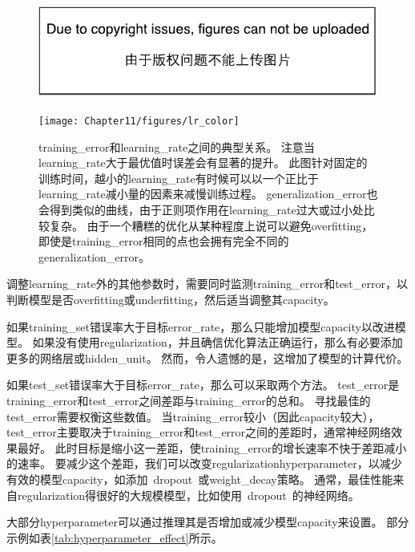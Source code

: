 \begin{figure}[!htb]
\ifOpenSource
\centerline{\includegraphics{figure.pdf}}
\else
\centerline{\texttt{[image: Chapter11/figures/lr\_color]}}
\fi
\caption{\gls{training_error}和\gls{learning_rate}之间的典型关系。
注意当\gls{learning_rate}大于最优值时误差会有显著的提升。
此图针对固定的训练时间，越小的\gls{learning_rate}有时候可以以一个正比于\gls{learning_rate}减小量的因素来减慢训练过程。
\gls{generalization_error}也会得到类似的曲线，由于正则项作用在\gls{learning_rate}过大或过小处比较复杂。
由于一个糟糕的优化从某种程度上说可以避免\gls{overfitting}，即使是\gls{training_error}相同的点也会拥有完全不同的\gls{generalization_error}。}
\label{fig:chap11_lr}
\end{figure}

调整\gls{learning_rate}外的其他参数时，需要同时监测\gls{training_error}和\gls{test_error}，以判断模型是否\gls{overfitting}或\gls{underfitting}，然后适当调整其\gls{capacity}。


如果\gls{training_set}错误率大于目标\gls{error_rate}，那么只能增加模型\gls{capacity}以改进模型。
如果没有使用\gls{regularization}，并且确信优化算法正确运行，那么有必要添加更多的网络层或\gls{hidden_unit}。
然而，令人遗憾的是，这增加了模型的计算代价。


如果\gls{test_set}错误率大于目标\gls{error_rate}，那么可以采取两个方法。
\gls{test_error}是\gls{training_error}和\gls{test_error}之间差距与\gls{training_error}的总和。
寻找最佳的\gls{test_error}需要权衡这些数值。
当\gls{training_error}较小（因此\gls{capacity}较大），\gls{test_error}主要取决于\gls{training_error}和\gls{test_error}之间的差距时，通常神经网络效果最好。
此时目标是缩小这一差距，使\gls{training_error}的增长速率不快于差距减小的速率。
要减少这个差距，我们可以改变\gls{regularization}\gls{hyperparameter}，以减少有效的模型\gls{capacity}，如添加~\gls{dropout}~或\gls{weight_decay}策略。
通常，最佳性能来自\gls{regularization}得很好的大规模模型，比如使用~\gls{dropout}~的神经网络。


大部分\gls{hyperparameter}可以通过推理其是否增加或减少模型\gls{capacity}来设置。
部分示例如表\ref{tab:hyperparameter_effect}所示。


